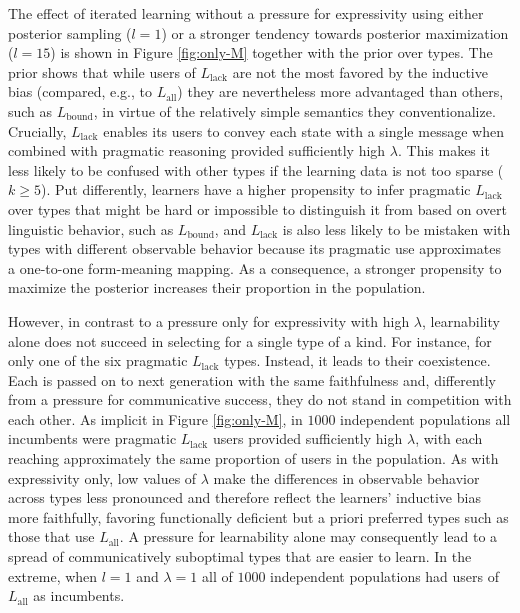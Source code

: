 \documentclass[a4paper, 11pt]{article}
\newcommand{\mylang}[1]{\ensuremath{L_{\text{#1}}}\xspace} %
\newcommand{\Lall}{\mylang{all}}
\newcommand{\Lbound}{\mylang{bound}}
\newcommand{\Llack}{\mylang{lack}}
\begin{document}
The effect of iterated learning without a pressure for expressivity using either posterior sampling ($l = 1$) or a stronger tendency towards posterior maximization ($l = 15$) is shown in Figure \ref{fig:only-M} together with the prior over types. The prior shows that while users of $\Llack$ are not the most favored by the inductive bias (compared, e.g., to $\Lall$) they are nevertheless more advantaged than others, such as $\Lbound$, in virtue of the relatively simple semantics they conventionalize. Crucially, $\Llack$ enables its users to convey each state with a single message when combined with pragmatic reasoning provided sufficiently high $\lambda$. This makes it less likely to be confused with other types if the learning data is not too sparse ($k \geq 5$). Put differently, learners have a higher propensity to infer pragmatic $\Llack$ over types that might be hard or impossible to distinguish it from based on overt linguistic behavior, such as $\Lbound$, and $\Llack$ is also less likely to be mistaken with types with different observable behavior because its pragmatic use approximates a one-to-one form-meaning mapping. As a consequence, a stronger propensity to maximize the posterior increases their proportion in the population. 

However, in contrast to a pressure only for expressivity with high $\lambda$, learnability alone does not succeed in selecting for a single type of a kind. For instance, for only one of the six pragmatic $\Llack$ types. Instead, it leads to their coexistence. Each is passed on to next generation with the same faithfulness and, differently from a pressure for communicative success, they do not stand in competition with each other. As implicit in Figure \ref{fig:only-M}, in $1000$ independent populations all incumbents were pragmatic $\Llack$ users provided sufficiently high $\lambda$, with each reaching approximately the same proportion of users in the population. As with expressivity only, low values of $\lambda$ make the differences in observable behavior across types less pronounced and therefore reflect the learners' inductive bias more faithfully, favoring functionally deficient but a priori preferred types such as those that use $\Lall$. A pressure for learnability alone may consequently lead to a spread of communicatively suboptimal types that are easier to learn. In the extreme, when $l = 1$ and $\lambda = 1$ all of $1000$ independent populations had users of $\Lall$ as incumbents.
\end{document}
